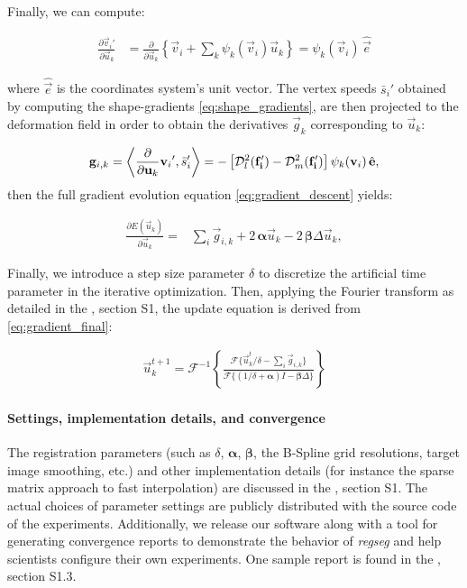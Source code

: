 Finally, we can compute:

  \begin{align}
  \frac{\partial \vec{v}_i'}{\partial \vec{u}_k} &= \frac{\partial}{\partial \vec{u}_k}
  \left\{ \vec{v}_i + \sum_k \psi_k(\vec{v}_i) \vec{u}_k \right\}
  = \psi_k(\vec{v}_i)\, \hat{\vec{e}}
  \label{eq:basis_derivative}
  \end{align}

  where $\hat{\vec{e}}$ is the coordinates system's unit vector.
The vertex speeds $\bar{s}_i'$ obtained by computing the shape-gradients \eqref{eq:shape_gradients},
	are then projected to the deformation field in order to obtain the derivatives $\vec{g}_k$
	corresponding to $\vec{u}_k$:

  \begin{equation}
  \vec{g}_{i,k} = \left\langle \frac{\partial}{\partial \vec{u}_k}{\vec{v}_i}', \bar{s}_i'\right\rangle
  = - \left[ \mdist{f_i'}{l} - \mdist{f_i'}{m} \right] \psi_k(\vec{v}_i)\, \hat{\vec{e}},
  \end{equation}
%
  then the full gradient evolution equation \eqref{eq:gradient_descent} yields:

  \begin{align}
  \frac{\partial E(\vec{u}_k)}{\partial \vec{u}_k} =
  &\underset{i}{\sum} \vec{g}_{i,k} +2\, \boldsymbol{\alpha} \vec{u}_k
  -2\, \boldsymbol{\beta} \Delta \vec{u}_k,
  \label{eq:gradient_final}
  \end{align}

Finally, we introduce a step size parameter $\delta$ to discretize the artificial time parameter
  in the iterative optimization.
Then, applying the Fourier transform as detailed in the \suppl{}, section S1, the
  update equation is derived from \eqref{eq:gradient_final}:

  \begin{align}
  \vec{u}_k^{t+1} = \mathcal{F}^{-1}\left\{ \frac{\mathcal{F}\{\vec{u}_k^t / \delta - \sum_i \vec{g}_{i,k}\}}%
                  {\mathcal{F}\{(1/\delta+\boldsymbol{\alpha})I-\boldsymbol{\beta}\Delta\}} \right\}
  \label{eq:update_equation}
  \end{align}


\paragraph*{Settings, implementation details, and convergence}
\label{sec:conv_report}
The registration parameters (such as $\delta$, $\boldsymbol{\alpha}$, $\boldsymbol{\beta}$,
  the B-Spline grid resolutions, target image smoothing, etc.)
  and other implementation details (for instance the sparse matrix approach
  to fast interpolation) are discussed in the \suppl{}, section S1.
The actual choices of parameter settings are publicly distributed with the source code of the experiments.
Additionally, we release our software along with a tool for generating convergence reports to
  demonstrate the behavior of \emph{regseg} and help scientists configure their own experiments.
One sample report is found in the \suppl{}, section S1.3.


